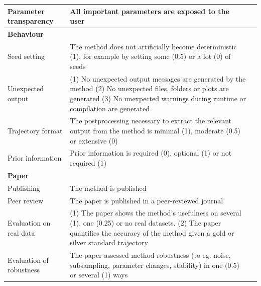 \begin{table}[tbh!]
\begin{tabular}{p{3.5cm}p{9cm}p{2.5cm}}
		Parameter transparency & All important parameters are exposed to the user & \cite{taschuk_tensimplerules_2017}\\
		
		\midrule
		\multicolumn{3}{l}{\textbf{Behaviour}} \\*
		
		Seed setting & The method does not artificially become deterministic (1), for example by setting some (0.5) or a lot (0) of seeds & \cite{puget_greendiceare_2016}\\*
		
		Unexpected output & (1) No unexpected output messages are generated by the method (2) No unexpected files, folders or plots are generated (3) No unexpected warnings during runtime or compilation are generated & \cite{artaza_top10metrics_2016}\\*
		
		Trajectory format & The postprocessing necessary to extract the relevant output from the method is minimal (1), moderate (0.5) or extensive (0) & \\*
		
		Prior information & Prior information is required (0), optional (1) or not required (1) & \\*
		
		\midrule
		\multicolumn{3}{l}{\textbf{Paper}} \\*
		
		Publishing & The method is published & \\*
		
		Peer review & The paper is published in a peer-reviewed journal & \cite{karimzadeh_topconsiderationscreating_,gannon_essentialrolepeer_2001,baldwin_refereeswetrust_2017}\\*
		
		Evaluation on real data & (1) The paper shows the method's usefulness on several (1), one (0.25) or no real datasets. (2) The paper quantifies the accuracy of the method given a gold or silver standard trajectory & \cite{aniba_issuesbioinformaticsbenchmarking_2010,jelizarow_overoptimismbioinformaticsillustration_2010}\\*
		
		Evaluation of robustness & The paper assessed method robustness (to eg. noise, subsampling, parameter changes, stability) in one (0.5) or several (1) ways & \cite{karimzadeh_topconsiderationscreating_,aniba_issuesbioinformaticsbenchmarking_2010,boulesteix_tensimplerules_2015,jelizarow_overoptimismbioinformaticsillustration_2010}\\
		
		\bottomrule
	\end{tabular}
	\endgroup{}
\end{table}

